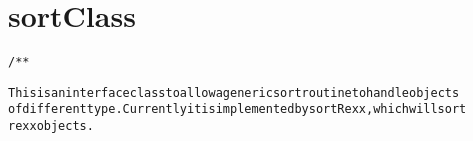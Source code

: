 \section{sortClass}
\begin{shaded}
\begin{alltt}
/**

This is an interface class to allow a generic sort routine to handle objects
of different type.  Currently it is implemented by sortRexx, which will sort
rexx objects.

\end{alltt}
\end{shaded}
